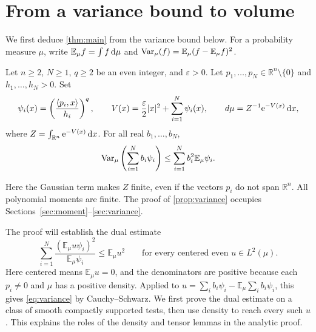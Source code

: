 \section{From a variance bound to volume}
\label{sec:reduction}

We first deduce \cref{thm:main} from the variance bound below. For a probability measure $\mu$, write $\mathbb{E}_\mu f=\int f\,\mathrm{d} \mu$ and $\operatorname{Var}_\mu(f)=\mathbb{E}_\mu(f-\mathbb{E}_\mu f)^2$.

\begin{proposition}\label{prop:variance}
Let $n\ge2$, $N\ge1$, $q\ge2$ be an even integer, and $\varepsilon>0$. Let $p_1,\ldots,p_N\in\mathbb{R}^n\setminus\{0\}$ and $h_1,\ldots,h_N>0$. Set
\begin{equation}\label{eq:potential}
 \psi_i(x)=\left(\frac{\langle p_i,x\rangle}{h_i}\right)^q,
 \qquad V(x)=\frac{\varepsilon}{2}|x|^2+\sum_{i=1}^N\psi_i(x),
 \qquad d\mu=Z^{-1}\mathrm{e}^{-V(x)}\,\mathrm{d} x,
\end{equation}
where $Z=\int_{\mathbb{R}^n}\mathrm{e}^{-V(x)}\,\mathrm{d} x$. For all real $b_1,\ldots,b_N$,
\begin{equation}\label{eq:variance}
 \operatorname{Var}_\mu\left(\sum_{i=1}^N b_i\psi_i\right)
 \le\sum_{i=1}^N b_i^2\mathbb{E}_\mu\psi_i.
\end{equation}
\end{proposition}

Here the Gaussian term makes $Z$ finite, even if the vectors $p_i$ do not span $\mathbb{R}^n$. All polynomial moments are finite. The proof of \cref{prop:variance} occupies Sections~\ref{sec:moment}--\ref{sec:variance}.


The proof will establish the dual estimate
\[
 \sum_{i=1}^N\frac{(\mathbb{E}_\mu u\psi_i)^2}{\mathbb{E}_\mu\psi_i}
 \le \mathbb{E}_\mu u^2
 \qquad\text{for every centered even }u\in L^2(\mu).
\]
Here centered means $\mathbb{E}_\mu u=0$, and the denominators are positive because each $p_i\ne0$ and $\mu$ has a positive density. Applied to $u=\sum_i b_i\psi_i-\mathbb{E}_\mu\sum_i b_i\psi_i$, this gives \eqref{eq:variance} by Cauchy--Schwarz.  We first prove the dual estimate on a class of smooth compactly supported tests, then use density to reach every such $u$.  This explains the roles of the density and tensor lemmas in the analytic proof.

